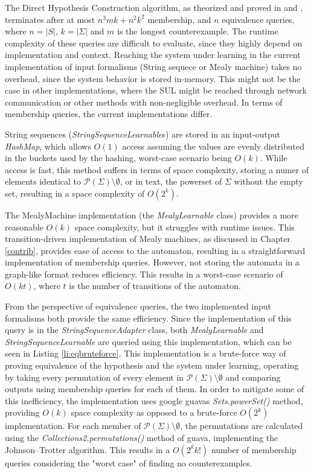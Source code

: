 The Direct Hypothesis Construction algorithm, as theorized and proved in \cite{Steffen2011} and \cite{10.1007/978-3-642-34781-8_19}, terminates after at most $n^3mk+n^2k^2$ membership, and $n$ equivalence queries, where $n=|S|$, $k=|\Sigma|$ and $m$ is the longest counterexample. The runtime complexity of these queries are difficult to evaluate, since they highly depend on implementation and context. Reaching the system under learning in the current implementation of input formalisms (String sequece or Mealy machine) takes no overhead, since the system behavior is stored in-memory. This might not be the case in other implementations, where the SUL might be reached through network communication or other methods with non-negligible overhead. In terms of membership queries, the current implementations differ. 

String sequences (\emph{StringSequenceLearnable}s) are stored in an input-output \emph{HashMap}, which allows $O(1)$ access assuming the values are evenly distributed in the buckets used by the hashing, worst-case scenario being $O(k)$. While access is fast, this method suffers in terms of space complexity, storing a numer of elements identical to $\mathcal{P}(\Sigma)\setminus\emptyset$, or in text, the powerset of $\Sigma$ without the empty set, resulting in a space complexity of $O(2^k)$.

The MealyMachine implementation (the \emph{MealyLearnable} class) provides a more reasonable $O(k)$ space complexity, but it struggles with runtime issues. This transition-driven implementation of Mealy machines, as discussed in Chapter \ref{contrib}, provides ease of access to the automaton, resulting in a straightforward implementation of membership queries. However, not storing the automata in a graph-like format reduces efficiency. This results in a worst-case scenario of $O(kt)$, where $t$ is the number of transitions of the automaton.

From the perspective of equivalence queries, the two implemented input formalisms both provide the same efficiency. Since the implementation of this query is in the \emph{StringSequenceAdapter} class, both \emph{MealyLearnable} and \emph{StringSequenceLearnable} are queried using this implementation, which can be seen in Listing \ref{li:eqbruteforce}. This implementation is a brute-force way of proving equivalence of the hypothesis and the system under learning, operating by taking every permutation of every element in $\mathcal{P}(\Sigma)\setminus\emptyset$ and comparing outputs using membership queries for each of them. In order to mitigate some of this inefficiency, the implementation uses google guavas \emph{Sets.powerSet()} method, providing $O(k)$ space complexity as opposed to a brute-force $O(2^k)$ implementation. For each member of $\mathcal{P}(\Sigma)\setminus\emptyset$, the permutations are calculated using the \emph{Collections2.permutations()} method of guava, implementing the Johnson–Trotter algorithm. This results in a $O(2^kk!)$ number of membership queries considering the "worst case" of finding no counterexamples.


